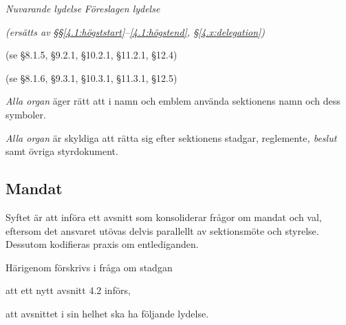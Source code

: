 \documentclass{article}
\newenvironment{lydelse}
    {\begin{paracol}{2}%
        \emph{Nuvarande lydelse}%
        \switchcolumn%
        \emph{Föreslagen lydelse}%
    \end{paracol}%
    \begin{enumerate}[label=\thesubsection.\arabic*]%
    \begin{paracol}{2}%
    }{\end{paracol}\end{enumerate}}
\begin{document}
\begin{lydelse}
	\switchcolumn
	  \emph{(ersätts av \S\S \ref{4.1:högststart}--\ref{4.1:högstend}, \S\ref{4.x:delegation})}
    
	\switchcolumn*
    \item[] (se \S 8.1.5, \S 9.2.1, \S 10.2.1, \S 11.2.1, \S 12.4)

    \item[] (se \S 8.1.6, \S 9.3.1, \S 10.3.1, \S 11.3.1, \S 12.5)

  \switchcolumn
    \item \emph{Alla organ} äger rätt att i namn och emblem använda sektionens namn och dess symboler.
      \label{4.1:emblem}

    \item \emph{Alla organ} är skyldiga att rätta sig efter sektionens stadgar, reglemente\emph{, beslut} samt övriga styrdokument.
      \label{4.1:rätta}

\end{lydelse}

\subsection{Mandat}
Syftet är att införa ett avsnitt som konsoliderar frågor om mandat och val, eftersom det ansvaret utövas delvis parallellt av sektionsmöte och styrelse.
Dessutom kodifieras praxis om entlediganden.

Härigenom förskrivs i fråga om stadgan
\begin{dels}
    \item att ett nytt avsnitt 4.2 införs,
    \item att avsnittet i sin helhet ska ha följande lydelse.
\end{dels}
\end{document}
